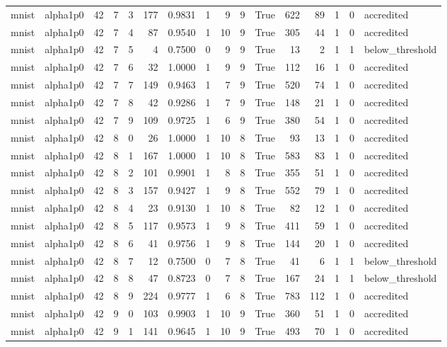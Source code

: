 \begin{tabular}{llrrrrrrrrrrrrrl}
mnist & alpha1p0 & 42 & 7 & 3 & 177 & 0.9831 & 1 & 9 & 9 & True & 622 & 89 & 1 & 0 & accredited \\
mnist & alpha1p0 & 42 & 7 & 4 & 87 & 0.9540 & 1 & 10 & 9 & True & 305 & 44 & 1 & 0 & accredited \\
mnist & alpha1p0 & 42 & 7 & 5 & 4 & 0.7500 & 0 & 9 & 9 & True & 13 & 2 & 1 & 1 & below\_threshold \\
mnist & alpha1p0 & 42 & 7 & 6 & 32 & 1.0000 & 1 & 9 & 9 & True & 112 & 16 & 1 & 0 & accredited \\
mnist & alpha1p0 & 42 & 7 & 7 & 149 & 0.9463 & 1 & 7 & 9 & True & 520 & 74 & 1 & 0 & accredited \\
mnist & alpha1p0 & 42 & 7 & 8 & 42 & 0.9286 & 1 & 7 & 9 & True & 148 & 21 & 1 & 0 & accredited \\
mnist & alpha1p0 & 42 & 7 & 9 & 109 & 0.9725 & 1 & 6 & 9 & True & 380 & 54 & 1 & 0 & accredited \\
mnist & alpha1p0 & 42 & 8 & 0 & 26 & 1.0000 & 1 & 10 & 8 & True & 93 & 13 & 1 & 0 & accredited \\
mnist & alpha1p0 & 42 & 8 & 1 & 167 & 1.0000 & 1 & 10 & 8 & True & 583 & 83 & 1 & 0 & accredited \\
mnist & alpha1p0 & 42 & 8 & 2 & 101 & 0.9901 & 1 & 8 & 8 & True & 355 & 51 & 1 & 0 & accredited \\
mnist & alpha1p0 & 42 & 8 & 3 & 157 & 0.9427 & 1 & 9 & 8 & True & 552 & 79 & 1 & 0 & accredited \\
mnist & alpha1p0 & 42 & 8 & 4 & 23 & 0.9130 & 1 & 10 & 8 & True & 82 & 12 & 1 & 0 & accredited \\
mnist & alpha1p0 & 42 & 8 & 5 & 117 & 0.9573 & 1 & 9 & 8 & True & 411 & 59 & 1 & 0 & accredited \\
mnist & alpha1p0 & 42 & 8 & 6 & 41 & 0.9756 & 1 & 9 & 8 & True & 144 & 20 & 1 & 0 & accredited \\
mnist & alpha1p0 & 42 & 8 & 7 & 12 & 0.7500 & 0 & 7 & 8 & True & 41 & 6 & 1 & 1 & below\_threshold \\
mnist & alpha1p0 & 42 & 8 & 8 & 47 & 0.8723 & 0 & 7 & 8 & True & 167 & 24 & 1 & 1 & below\_threshold \\
mnist & alpha1p0 & 42 & 8 & 9 & 224 & 0.9777 & 1 & 6 & 8 & True & 783 & 112 & 1 & 0 & accredited \\
mnist & alpha1p0 & 42 & 9 & 0 & 103 & 0.9903 & 1 & 10 & 9 & True & 360 & 51 & 1 & 0 & accredited \\
mnist & alpha1p0 & 42 & 9 & 1 & 141 & 0.9645 & 1 & 10 & 9 & True & 493 & 70 & 1 & 0 & accredited \\

\end{tabular}
